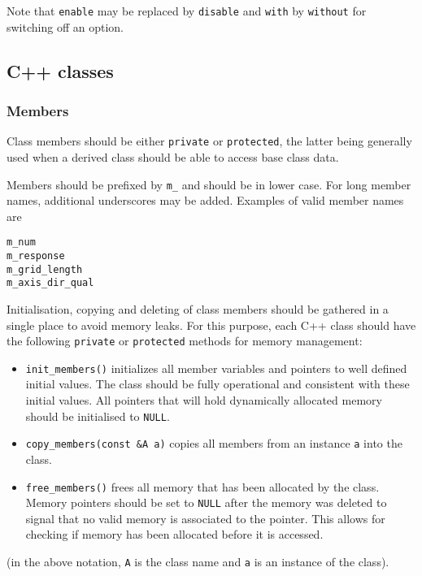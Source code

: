\documentclass{article}[12pt,a4]
\begin{document}
Note that {\tt enable} may be replaced by {\tt disable} and {\tt with} by {\tt without} for switching off
an option.


\subsection{C++ classes}

\subsubsection{Members}

Class members should be either {\tt private} or {\tt protected}, the latter being generally used
when a derived class should be able to access base class data.

Members should be prefixed by {\tt m\_} and should be in lower case.
For long member names, additional underscores may be added.
Examples of valid member names are
\begin{verbatim}
m_num
m_response
m_grid_length
m_axis_dir_qual
\end{verbatim}

Initialisation, copying and deleting of class members should be gathered in a single
place to avoid memory leaks.
For this purpose, each C++ class should have the following {\tt private} or {\tt protected}
methods for memory management:
\begin{itemize}
\item {\tt init\_members()} initializes all member variables and pointers to well defined
initial values. The class should be fully operational and consistent with these initial
values. All pointers that will hold dynamically allocated memory should be
initialised to {\tt NULL}.
\item {\tt copy\_members(const \&A a)} copies all members from an instance {\tt a}
into the class.
\item {\tt free\_members()} frees all memory that has been allocated by the class.
Memory pointers should be set to {\tt NULL} after the memory was deleted to signal
that no valid memory is associated to the pointer.
This allows for checking if memory has been allocated before it is accessed.
\end{itemize}
(in the above notation, {\tt A} is the class name and {\tt a} is an instance of the class).
\end{document}
